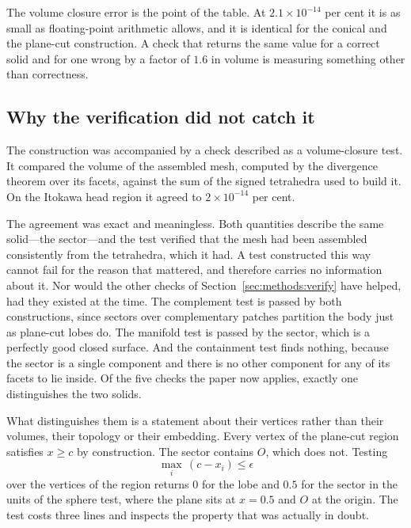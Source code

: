 The volume closure error is the point of the table. At
$2.1\times10^{-14}$ per cent it is as small as floating-point arithmetic allows,
and it is identical for the conical and the plane-cut construction. A check
that returns the same value for a correct solid and for one wrong by a factor
of $1.6$ in volume is measuring something other than correctness.




\subsection{Why the verification did not catch it}
\label{app:cone:verification}

The construction was accompanied by a check described as a volume-closure test.
It compared the volume of the assembled mesh, computed by the divergence
theorem over its facets, against the sum of the signed tetrahedra used to build
it. On the Itokawa head region it agreed to $2\times10^{-14}$ per cent.

The agreement was exact and meaningless. Both quantities describe the same
solid---the sector---and the test verified that the mesh had been assembled
consistently from the tetrahedra, which it had. A test constructed this way
cannot fail for the reason that mattered, and therefore carries no information
about it. Nor would the other checks of Section~\ref{sec:methods:verify} have helped, had
they existed at the time. The complement test is passed by both constructions,
since sectors over complementary patches partition the body just as plane-cut
lobes do. The manifold test is passed by the sector, which is a perfectly good
closed surface. And the containment test finds nothing, because the sector is a
single component and there is no other component for any of its facets to lie
inside. Of the five checks the paper now applies, exactly one distinguishes the
two solids.

What distinguishes them is a statement about their vertices rather than their
volumes, their topology or their embedding. Every vertex of the plane-cut region
satisfies $x \ge c$ by construction. The sector contains $O$, which does not.
Testing
\begin{equation}
\max_i \,(c - x_i) \le \epsilon
\label{eq:apppredicate}
\end{equation}
over the vertices of the region returns $0$ for the lobe and $0.5$ for the
sector in the units of the sphere test, where the plane sits at $x = 0.5$ and
$O$ at the origin. The test costs three lines and inspects the property that
was actually in doubt.

